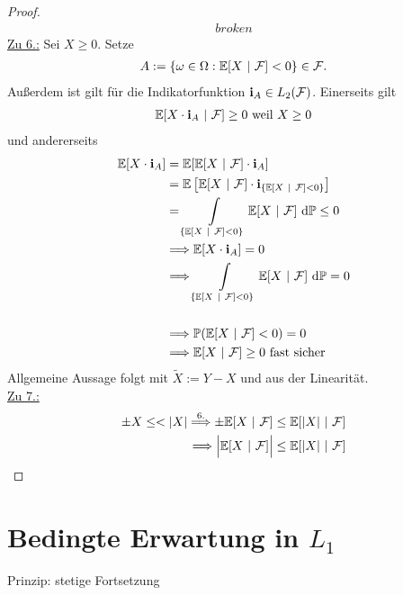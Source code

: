 \begin{proof}
\begin{align*}
broken
\end{align*}
\underline{Zu 6.:} Sei $X\geq0$. Setze
\begin{align*}
A:=\lbrace\omega\in\Omega:\mathbb{E}[X~|~\mathcal{F}]<0\rbrace\in\mathcal{F}.
\end{align*}
Außerdem ist gilt für die Indikatorfunktion $\textbf{i}_A\in L_2(\mathcal{F})$.
Einerseits gilt
\begin{align*}
\mathbb{E}[X\cdot\textbf{i}_A~|~\mathcal{F}]\geq0\text{ weil }X\geq0
\end{align*}
und andererseits
\begin{align*}
\mathbb{E}[X\cdot\textbf{i}_A]
&=\mathbb{E}[\mathbb{E}[X~|~\mathcal{F}]\cdot\textbf{i}_A]\\
&=\mathbb{E}\left[\mathbb{E}[X~|~\mathcal{F}]\cdot\textbf{i}_{\lbrace\mathbb{E}[X~|~\mathcal{F}]<0\rbrace}\right]\\
&=\int\limits_{\lbrace\mathbb{E}[X~|~\mathcal{F}]<0\rbrace} \mathbb{E}[X~|~\mathcal{F}]\text{ d}\mathbb{P}\leq0\\
&\Longrightarrow\mathbb{E}[X\cdot\textbf{i}_A]=0\\
&\Longrightarrow\int\limits_{\lbrace\mathbb{E}[X~|~\mathcal{F}]<0\rbrace} \mathbb{E}[X~|~\mathcal{F}]\text{ d}\mathbb{P}=0\\\\
&\Longrightarrow \mathbb{P}(\mathbb{E}[X~|~\mathcal{F}]<0)=0\\
&\Longrightarrow\mathbb{E}[X~|~\mathcal{F}]\geq0\text { fast sicher}
\end{align*}
Allgemeine Aussage folgt mit $\tilde{X}:=Y-X$ und aus der Linearität.\\
\underline{Zu 7.:}
\begin{align*}
\pm X\leq<|X|
\stackrel{6.}{\Longrightarrow}
\pm\E[X~|~\mathcal{F}]\leq\E[|X|~|~\mathcal{F}]\\
\Longrightarrow\Big|\E[X~|~\mathcal{F}]\Big|\leq\E[|X|~|~\mathcal{F}]
\end{align*}
\end{proof}
 
\section{Bedingte Erwartung in $L_1$}
Prinzip: stetige Fortsetzung

